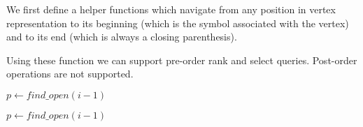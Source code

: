 We first define a helper functions which navigate from any position in vertex representation to its beginning (which is the symbol associated with the vertex) and to its end (which is always a closing parenthesis).

\begin{algorithmic}
		\State {} 
		\State {} 
	\Else
		\State {}
	\EndIf
\EndFunction
\end{algorithmic}

\begin{algorithmic}
		\State {}
	\Else
		\State {}
	\EndIf
\EndFunction
\end{algorithmic}

\begin{algorithmic}
 
		\State {}
	\Else
		\State {}
	\EndIf
\EndFunction
\end{algorithmic}

Using these function we can support pre-order rank and select queries.
Post-order operations are not supported.

\begin{algorithmic}
	\State {}
\EndFunction
\end{algorithmic}

\begin{algorithmic}
	\State {}
\EndFunction
\end{algorithmic}

\begin{algorithmic}
		\State {}
	\Else
		\State $p \gets find\_open(i - 1)$ 
		\State {}
	\EndIf
\EndFunction
\end{algorithmic}

\begin{algorithmic}
	\State {}
\EndFunction
\end{algorithmic}

\begin{algorithmic}
		\State {}
	\Else
		\State $p \gets find\_open(i - 1)$
		\State {}
	\EndIf
\EndFunction
\end{algorithmic}


